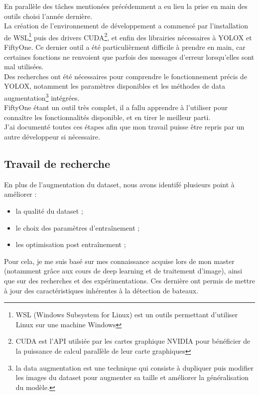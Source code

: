 En parallèle des tâches mentionées précédemment a eu lieu la prise en main des outils
choisi l'année dernière.\\

La création de l'environnement de développement a commencé par l'installation
de WSL\footnote{WSL (Windows Subsystem for Linux) est un outils permettant d'utiliser
Linux sur une machine Windows} puis des drivers CUDA\footnote{CUDA est l'API utilsiée par
les cartes graphique NVIDIA pour bénéficier de la puissance de calcul parallèle
de leur carte graphiques}, et enfin des librairies nécessaires à YOLOX et FiftyOne. 
Ce dernier outil a été particulièrment difficile
à prendre en main, car certaines fonctions ne renvoient que parfois des messages 
d'erreur lorsqu'elles sont mal utilisées.\\

Des recherches ont été nécessaires pour comprendre le fonctionnement précis de YOLOX, 
notamment les paramètres disponibles et les méthodes de data augmentation\footnote{la
data augmentation est une technique qui consiste à dupliquer puis modifier les images
du dataset pour augmenter sa taille et améliorer la généralisation du modèle.} intégrées. \\

FiftyOne étant un outil très complet, il a fallu apprendre à l'utiliser pour connaître
les fonctionnalités disponible, et en tirer le meilleur parti. \\


J'ai documenté toutes ces étapes afin que mon travail puisse être repris par un autre
développeur si nécessaire.\\

\subsection{Travail de recherche}

En plus de l'augmentation du dataset, nous avons identifé plusieurs point à améliorer : 

\begin{itemize}
    \item la qualité du dataset ; 
    \item le choix des paramètres d'entraînement ; 
    \item les optimisation post entraînement ;
\end{itemize}

Pour cela, je me suis basé sur mes connaissance acquise lors de mon master (notamment grâce aux cours
de deep learning et de traitement d'image), ainsi que sur des recherches et des expérimentations. 
Ces dernière ont permis de mettre à jour des caractéristiques inhérentes à la détection de bateaux. \\ 

